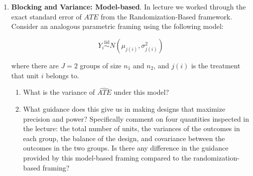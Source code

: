 \documentclass[
  letterpaper,
  DIV=11,
  numbers=noendperiod]{scrartcl}
\begin{document}
\newpage{}

\begin{enumerate}
\def\labelenumi{\arabic{enumi}.}
\setcounter{enumi}{4}
\item
  \textbf{Blocking and Variance: Model-based}. In lecture we worked
  through the exact standard error of \(\widehat{ATE}\) from the
  Randomization-Based framework. Consider an analogous parametric
  framing using the following model:

  \[Y_i \overset{\text{iid}}{\sim} N(\mu_{j(i)}, \sigma^2_{j(i)})\]

  where there are \(J = 2\) groups of size \(n_1\) and \(n_2\), and
  \(j(i)\) is the treatment that unit \(i\) belongs to.

  \begin{enumerate}
  \def\labelenumii{\alph{enumii}.}
  \item
    What is the variance of \(\widehat{ATE}\) under this model?
  \item
    What guidance does this give us in making designs that maximize
    precision and power? Specifically comment on four quantities
    inspected in the lecture: the total number of units, the variances
    of the outcomes in each group, the balance of the design, and
    covariance between the outcomes in the two groups. Is there any
    difference in the guidance provided by this model-based framing
    compared to the randomization-based framing?
  \end{enumerate}
\end{enumerate}
\end{document}
